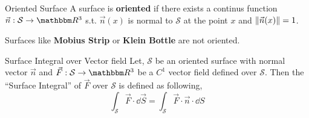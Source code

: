 \documentclass[Analysis-3]{subfiles}
\begin{document}
\begin{Def}{Oriented Surface}{}
    A surface is \textbf{oriented} if there exists a continus function $\vec{n} : \mathcal{S} \to \R^3$ s.t. $\vec{n}(x)$ is normal to $\mathcal{S}$ at the point $x$ and $\norm{\vec{n}(x)} = 1$.
\end{Def}


Surfaces like \textbf{Mobius Strip} or \textbf{Klein Bottle} are not oriented.

\begin{Def}{Surface Integral over Vector field}{}
    Let, $\mathcal{S}$ be an oriented surface with normal vector $\vec{n}$ and $\vec{F} : \mathcal{S} \to \R^3$ be a $C^1$ vector field defined over $\mathcal{S}$. Then the  ``Surface Integral'' of $\vec{F}$ over $\mathcal{S}$ is defined as following,
     \[ \int_{\mathcal{S}} \vec{F} \cdot \dd \vec{S} = \int_{\mathcal{S}} \vec{F}\cdot\vec{n} \cdot \dd S \]
\end{Def}


\end{document}
